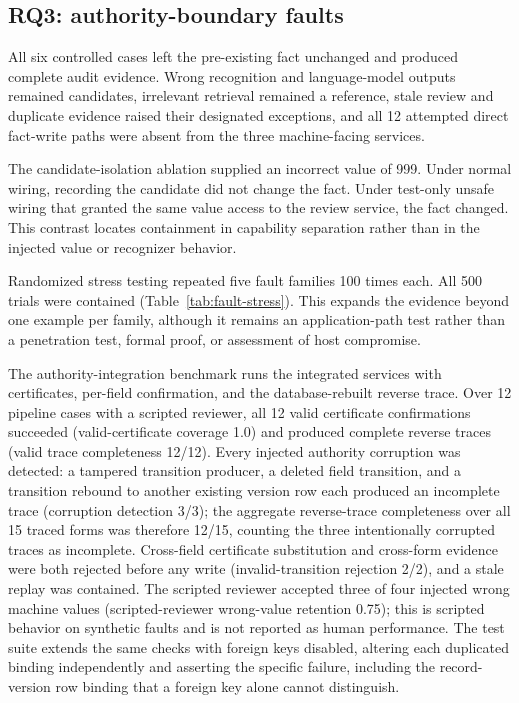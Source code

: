\subsection{RQ3: authority-boundary faults}
All six controlled cases left the pre-existing fact unchanged and produced complete audit evidence. Wrong recognition and language-model outputs remained candidates, irrelevant retrieval remained a reference, stale review and duplicate evidence raised their designated exceptions, and all 12 attempted direct fact-write paths were absent from the three machine-facing services.

The candidate-isolation ablation supplied an incorrect value of 999. Under normal wiring, recording the candidate did not change the fact. Under test-only unsafe wiring that granted the same value access to the review service, the fact changed. This contrast locates containment in capability separation rather than in the injected value or recognizer behavior.

Randomized stress testing repeated five fault families 100 times each. All 500 trials were contained (Table~\ref{tab:fault-stress}). This expands the evidence beyond one example per family, although it remains an application-path test rather than a penetration test, formal proof, or assessment of host compromise.

\begin{table}[!ht]
  \centering
  \caption{Seeded randomized trust-boundary stress test.}
  \label{tab:fault-stress}
  
\end{table}
\FloatBarrier

The authority-integration benchmark runs the integrated services with certificates, per-field confirmation, and the database-rebuilt reverse trace. Over 12 pipeline cases with a scripted reviewer, all 12 valid certificate confirmations succeeded (valid-certificate coverage 1.0) and produced complete reverse traces (valid trace completeness 12/12). Every injected authority corruption was detected: a tampered transition producer, a deleted field transition, and a transition rebound to another existing version row each produced an incomplete trace (corruption detection 3/3); the aggregate reverse-trace completeness over all 15 traced forms was therefore 12/15, counting the three intentionally corrupted traces as incomplete. Cross-field certificate substitution and cross-form evidence were both rejected before any write (invalid-transition rejection 2/2), and a stale replay was contained. The scripted reviewer accepted three of four injected wrong machine values (scripted-reviewer wrong-value retention 0.75); this is scripted behavior on synthetic faults and is not reported as human performance. The test suite extends the same checks with foreign keys disabled, altering each duplicated binding independently and asserting the specific failure, including the record-version row binding that a foreign key alone cannot distinguish.

